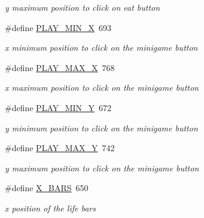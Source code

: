 \begin{DoxyCompactItemize}
\begin{DoxyCompactList}\small\item\em y maximum position to click on eat button \end{DoxyCompactList}\item 
\mbox{\label{group___project_ga0444a3279ec543cd16fcd662fefd3c67}} 
\#define \hyperlink{group___project_ga0444a3279ec543cd16fcd662fefd3c67}{P\+L\+A\+Y\+\_\+\+M\+I\+N\+\_\+X}~693
\begin{DoxyCompactList}\small\item\em x minimum position to click on the minigame button \end{DoxyCompactList}\item 
\mbox{\label{group___project_ga837174c0ee7d14d3cd2c6130c5e157a7}} 
\#define \hyperlink{group___project_ga837174c0ee7d14d3cd2c6130c5e157a7}{P\+L\+A\+Y\+\_\+\+M\+A\+X\+\_\+X}~768
\begin{DoxyCompactList}\small\item\em x maximum position to click on the minigame button \end{DoxyCompactList}\item 
\mbox{\label{group___project_gabf2f42f45f41534dacae5b7806a72f3d}} 
\#define \hyperlink{group___project_gabf2f42f45f41534dacae5b7806a72f3d}{P\+L\+A\+Y\+\_\+\+M\+I\+N\+\_\+Y}~672
\begin{DoxyCompactList}\small\item\em y minimum position to click on the minigame button \end{DoxyCompactList}\item 
\mbox{\label{group___project_ga4438cef0e3299f6ab164be8514321705}} 
\#define \hyperlink{group___project_ga4438cef0e3299f6ab164be8514321705}{P\+L\+A\+Y\+\_\+\+M\+A\+X\+\_\+Y}~742
\begin{DoxyCompactList}\small\item\em y maximum position to click on the minigame button \end{DoxyCompactList}\item 
\mbox{\label{group___project_ga3cf7ef78e32aa94c510c8699651365f5}} 
\#define \hyperlink{group___project_ga3cf7ef78e32aa94c510c8699651365f5}{X\+\_\+\+B\+A\+RS}~650
\begin{DoxyCompactList}\small\item\em x position of the life bars \end{DoxyCompactList}\item 

\end{DoxyCompactItemize}
